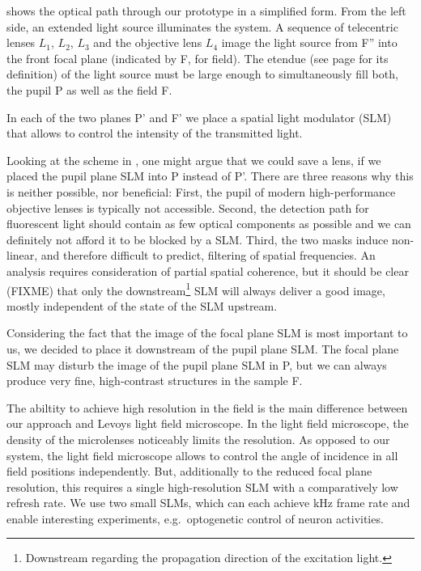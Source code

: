  shows the optical path through our prototype
in a simplified form.  From the left side, an extended light source
illuminates the system. A sequence of telecentric lenses $L_1$, $L_2$,
$L_3$ and the objective lens $L_4$ image the light source from F''
into the front focal plane (indicated by F, for field). The etendue
(see page \pageref{sec:etendue} for its definition) of the light
source must be large enough to simultaneously fill both, the pupil P
as well as the field F.

In each of the two planes P' and F' we place a spatial light modulator
(SLM) that allows to control the intensity of the transmitted light.

Looking at the scheme in , one might argue
that we could save a lens, if we placed the pupil plane SLM into P
instead of P'. There are three reasons why this is neither possible,
nor beneficial: First, the pupil of modern high-performance objective
lenses is typically not accessible. Second, the detection path for
fluorescent light should contain as few optical components as possible
and we can definitely not afford it to be blocked by a SLM.  Third,
the two masks induce non-linear, and therefore difficult to predict,
filtering of spatial frequencies. An analysis requires consideration
of partial spatial coherence, but it should be clear (FIXME) that only
the downstream\footnote{Downstream regarding the propagation direction
  of the excitation light.} SLM will always deliver a good image,
mostly independent of the state of the SLM upstream.

Considering the fact that the image of the focal plane SLM is most
important to us, we decided to place it downstream of the pupil plane
SLM. The focal plane SLM may disturb the image of the pupil plane SLM
in P, but we can always produce very fine, high-contrast structures in
the sample F.

The abiltity to achieve high resolution in the field is the main
difference between our approach and Levoys light field microscope.  In
the light field microscope, the density of the microlenses noticeably
limits the resolution. As opposed to our system, the light field
microscope allows to control the angle of incidence in all field
positions independently.  But, additionally to the reduced focal plane
resolution, this requires a single high-resolution SLM with a
comparatively low refresh rate. We use two small SLMs, which can each
achieve \unit[1]{kHz} frame rate and enable interesting experiments,
e.g.\ optogenetic control of neuron activities.

